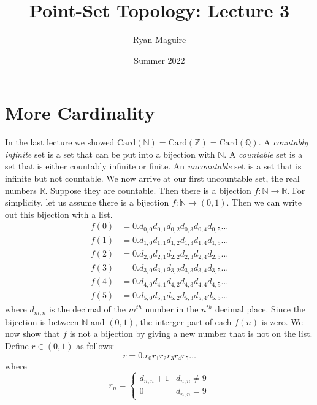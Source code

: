 \documentclass{article}
\title{Point-Set Topology: Lecture 3}
\author{Ryan Maguire}
\date{Summer 2022}
\theoremstyle{plain}
\theoremstyle{normal}
\begin{document}
    \maketitle
    \section{More Cardinality}
        In the last lecture we showed
        $\textrm{Card}(\mathbb{N})=\textrm{Card}(\mathbb{Z})=\textrm{Card}(\mathbb{Q})$.
        A \textit{countably infinite} set is a set that can be put into a
        bijection with $\mathbb{N}$. A \textit{countable} set is a set that
        is either countably infinite or finite. An \textit{uncountable} set is
        a set that is infinite but not countable. We now arrive at our first
        uncountable set, the real numbers $\mathbb{R}$. Suppose they are
        countable. Then there is a bijection
        $f:\mathbb{N}\rightarrow\mathbb{R}$. For simplicity, let us assume there
        is a bijection $f:\mathbb{N}\rightarrow(0,1)$. Then we can write out
        this bijection with a list.
        \begin{align}
            f(0)&=0.d_{0,0}d_{0,1}d_{0,2}d_{0,3}d_{0,4}d_{0,5}\dots\\
            f(1)&=0.d_{1,0}d_{1,1}d_{1,2}d_{1,3}d_{1,4}d_{1,5}\dots\\
            f(2)&=0.d_{2,0}d_{2,1}d_{2,2}d_{2,3}d_{2,4}d_{2,5}\dots\\
            f(3)&=0.d_{3,0}d_{3,1}d_{3,2}d_{3,3}d_{3,4}d_{3,5}\dots\\
            f(4)&=0.d_{4,0}d_{4,1}d_{4,2}d_{4,3}d_{4,4}d_{4,5}\dots\\
            f(5)&=0.d_{5,0}d_{5,1}d_{5,2}d_{5,3}d_{5,4}d_{5,5}\dots
        \end{align}
        where $d_{m,n}$ is the decimal of the $m^{th}$ number in the
        $n^{th}$ decimal place. Since the bijection is between
        $\mathbb{N}$ and $(0,1)$, the interger part of each $f(n)$ is zero.
        We now show that $f$ is not a bijection by giving a new number that is
        not on the list. Define $r\in(0,1)$ as follows:
        \begin{equation}
            r=0.r_{0}r_{1}r_{2}r_{3}r_{4}r_{5}\dots
        \end{equation}
        where
        \begin{equation}
            r_{n}=
            \begin{cases}
                d_{n,n}+1&d_{n,n}\ne{9}\\
                0&d_{n,n}=9
            \end{cases}
        \end{equation}
\end{document}
